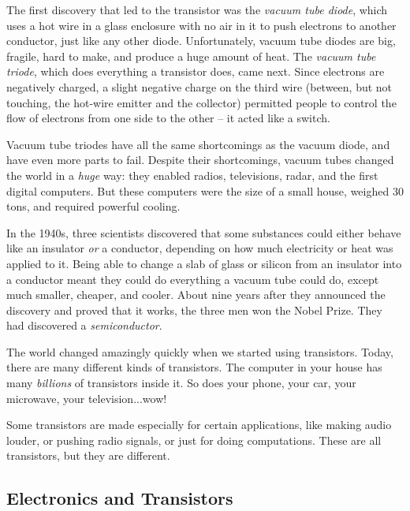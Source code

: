 The first discovery that led to the transistor was the \emph{vacuum tube diode}, which uses a hot wire in a glass enclosure with no air in it to push electrons to another conductor, just like any other diode. Unfortunately, vacuum tube diodes are big, fragile, hard to make, and produce a huge amount of heat. The \emph{vacuum tube triode}, which does everything a transistor does, came next. Since electrons are negatively charged, a slight negative charge on the third wire (between, but not touching, the hot-wire emitter and the collector) permitted people to control the flow of electrons from one side to the other -- it acted like a switch. 

Vacuum tube triodes have all the same shortcomings as the vacuum diode, and have even more parts to fail. Despite their shortcomings, vacuum tubes changed the world in a \emph{huge} way: they enabled radios, televisions, radar, and the first digital computers. But these computers were the size of a small house, weighed 30 tons, and required powerful cooling.

In the 1940s, three scientists discovered that some substances could either behave like an insulator \emph{or} a conductor, depending on how much electricity or heat was applied to it. Being able to change a slab of glass or silicon from an insulator into a conductor meant they could do everything a vacuum tube could do, except much smaller, cheaper, and cooler. About nine years after they announced the discovery and proved that it works, the three men won the Nobel Prize. They had discovered a \emph{semiconductor}. 


The world changed amazingly quickly when we started using transistors. Today, there are many different kinds of transistors. The computer in your house has many \emph{billions} of transistors inside it. So does your phone, your car, your microwave, your television...wow!

Some transistors are made especially for certain applications, like making audio louder, or pushing radio signals, or just for doing computations. These are all transistors, but they are different. 




\subsection*{Electronics and Transistors}

